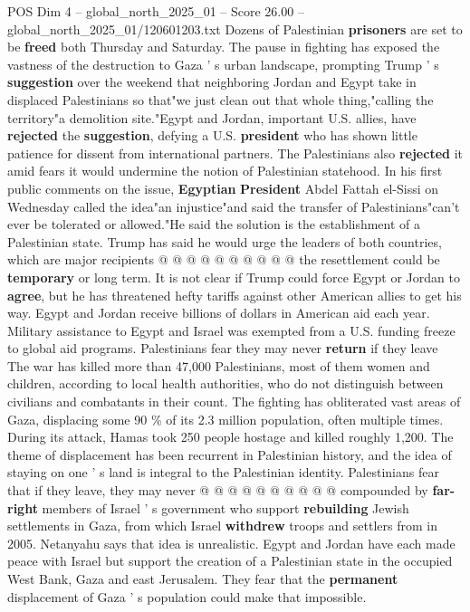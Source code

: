 \begin{textsample}{POS Dim 4 – global\_north\_2025\_01 – Score 26.00 – global\_north\_2025\_01/120601203.txt}
Dozens of Palestinian \textbf{prisoners} are set to be \textbf{freed} both Thursday and Saturday.
The pause in fighting has exposed the vastness of the destruction to Gaza ' s urban landscape, prompting Trump ' s \textbf{suggestion} over the weekend that neighboring Jordan and Egypt take in displaced Palestinians so that"we just clean out that whole thing,"calling the territory"a demolition site."Egypt and Jordan, important U.S. allies, have \textbf{rejected} the \textbf{suggestion}, defying a U.S. \textbf{president} who has shown little patience for dissent from international partners.
The Palestinians also \textbf{rejected} it amid fears it would undermine the notion of Palestinian statehood.
In his first public comments on the issue, \textbf{Egyptian} \textbf{President} Abdel Fattah el-Sissi on Wednesday called the idea"an injustice"and said the transfer of Palestinians"can't ever be tolerated or allowed."He said the solution is the establishment of a Palestinian state.
Trump has said he would urge the leaders of both countries, which are major recipients @ @ @ @ @ @ @ @ @ @ the resettlement could be \textbf{temporary} or long term.
It is not clear if Trump could force Egypt or Jordan to \textbf{agree}, but he has threatened hefty tariffs against other American allies to get his way.
Egypt and Jordan receive billions of dollars in American aid each year.
Military assistance to Egypt and Israel was exempted from a U.S. funding freeze to global aid programs.
Palestinians fear they may never \textbf{return} if they leave The war has killed more than 47,000 Palestinians, most of them women and children, according to local health authorities, who do not distinguish between civilians and combatants in their count.
The fighting has obliterated vast areas of Gaza, displacing some 90 \% of its 2.3 million population, often multiple times.
During its attack, Hamas took 250 people hostage and killed roughly 1,200.
The theme of displacement has been recurrent in Palestinian history, and the idea of staying on one ' s land is integral to the Palestinian identity.
Palestinians fear that if they leave, they may never @ @ @ @ @ @ @ @ @ @ compounded by \textbf{far-right} members of Israel ' s government who support \textbf{rebuilding} Jewish settlements in Gaza, from which Israel \textbf{withdrew} troops and settlers from in 2005.
Netanyahu says that idea is unrealistic.
Egypt and Jordan have each made peace with Israel but support the creation of a Palestinian state in the occupied West Bank, Gaza and east Jerusalem.
They fear that the \textbf{permanent} displacement of Gaza ' s population could make that impossible.

\end{textsample}
